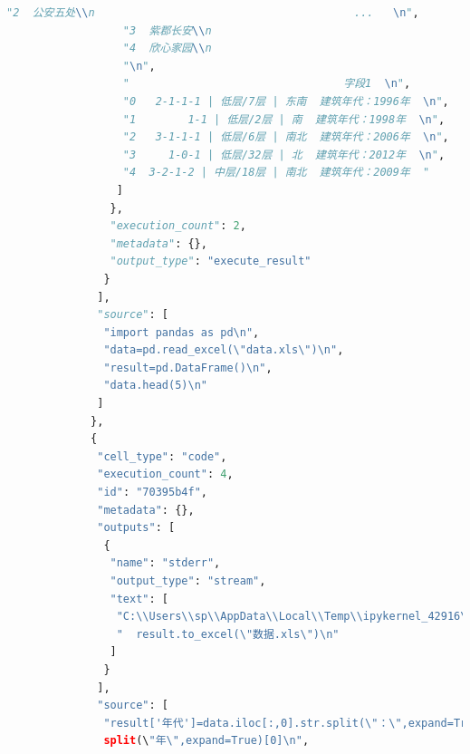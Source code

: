 \documentclass[withoutpreface,bwprint]{cumcmthesis} %
\begin{document}
\begin{appendices}
\begin{lstlisting}[language=Python]
                  "2  公安五处\\n                                        ...   \n",
                  "3  紫郡长安\\n                                        ...   \n",
                  "4  欣心家园\\n                                        ...   \n",
                  "\n",
                  "                                 字段1  \n",
                  "0   2-1-1-1 | 低层/7层 | 东南  建筑年代：1996年  \n",
                  "1        1-1 | 低层/2层 | 南  建筑年代：1998年  \n",
                  "2   3-1-1-1 | 低层/6层 | 南北  建筑年代：2006年  \n",
                  "3     1-0-1 | 低层/32层 | 北  建筑年代：2012年  \n",
                  "4  3-2-1-2 | 中层/18层 | 南北  建筑年代：2009年  "
                 ]
                },
                "execution_count": 2,
                "metadata": {},
                "output_type": "execute_result"
               }
              ],
              "source": [
               "import pandas as pd\n",
               "data=pd.read_excel(\"data.xls\")\n",
               "result=pd.DataFrame()\n",
               "data.head(5)\n"
              ]
             },
             {
              "cell_type": "code",
              "execution_count": 4,
              "id": "70395b4f",
              "metadata": {},
              "outputs": [
               {
                "name": "stderr",
                "output_type": "stream",
                "text": [
                 "C:\\Users\\sp\\AppData\\Local\\Temp\\ipykernel_42916\\59496173.py:12: FutureWarning: As the xlwt package is no longer maintained, the xlwt engine will be removed in a future version of pandas. This is the only engine in pandas that supports writing in the xls format. Install openpyxl and write to an xlsx file instead. You can set the option io.excel.xls.writer to 'xlwt' to silence this warning. While this option is deprecated and will also raise a warning, it can be globally set and the warning suppressed.\n",
                 "  result.to_excel(\"数据.xls\")\n"
                ]
               }
              ],
              "source": [
               "result['年代']=data.iloc[:,0].str.split(\"：\",expand=True)[1].str.
               split(\"年\",expand=True)[0]\n",

\end{lstlisting}
\end{appendices}
\end{document}
